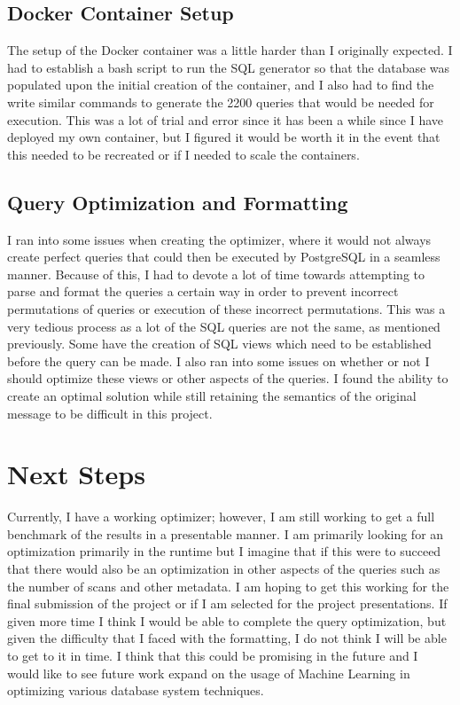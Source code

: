 \documentclass[sigconf]{acmart}
\begin{document}
\subsection{Docker Container Setup}
The setup of the Docker container was a little harder than I originally expected. I had to establish a bash script to run the SQL generator so that the database was populated upon the initial creation
of the container, and I also had to find the write similar commands to generate the 2200 queries that would be needed for execution. This was a lot of trial and error since it has been a while since I have
deployed my own container, but I figured it would be worth it in the event that this needed to be recreated or if I needed to scale the containers.

\subsection{Query Optimization and Formatting}
I ran into some issues when creating the optimizer, where it would not always create perfect queries that could then be executed by PostgreSQL in a seamless manner. Because of this, I had to devote a lot of time towards
attempting to parse and format the queries a certain way in order to prevent incorrect permutations of queries or execution of these incorrect permutations. This was a very tedious process as a lot of the SQL queries are not 
the same, as mentioned previously. Some have the creation of SQL views which need to be established before the query can be made. I also ran into some issues on whether or not I should optimize these views or other aspects of the queries.
I found the ability to create an optimal solution while still retaining the semantics of the original message to be difficult in this project.

\section{Next Steps}
Currently, I have a working optimizer; however, I am still working to get a full benchmark of the results in a presentable manner. I am primarily looking for an optimization primarily in the runtime but I imagine
that if this were to succeed that there would also be an optimization in other aspects of the queries such as the number of scans and other metadata. I am hoping to get this working for the final submission of the 
project or if I am selected for the project presentations. If given more time I think I would be able to complete the query optimization, but given the difficulty that I faced with the formatting, I do not think I will be able to
get to it in time. I think that this could be promising in the future and I would like to see future work expand on the usage of Machine Learning in optimizing various database system techniques.
\end{document}
